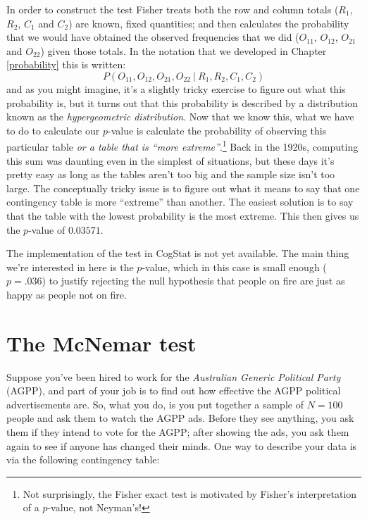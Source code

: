 \documentclass[
  11pt,
  a4paper,
  twoside,symmetric,openright]{book}
\theoremstyle{break}
\theoremstyle{break}
\begin{document}
In order to construct the test Fisher treats both the row and column totals (\(R_1\), \(R_2\), \(C_1\) and \(C_2\)) are known, fixed quantities; and then calculates the probability that we would have obtained the observed frequencies that we did (\(O_{11}\), \(O_{12}\), \(O_{21}\) and \(O_{22}\)) given those totals. In the notation that we developed in Chapter \ref{probability} this is written:
\[
P(O_{11}, O_{12}, O_{21}, O_{22} \ | \ R_1, R_2, C_1, C_2) 
\]
and as you might imagine, it's a slightly tricky exercise to figure out what this probability is, but it turns out that this probability is described by a distribution known as the \emph{hypergeometric distribution}. Now that we know this, what we have to do to calculate our \(p\)-value is calculate the probability of observing this particular table \emph{or a table that is ``more extreme''}.\footnote{Not surprisingly, the Fisher exact test is motivated by Fisher's interpretation of a \(p\)-value, not Neyman's!} Back in the 1920s, computing this sum was daunting even in the simplest of situations, but these days it's pretty easy as long as the tables aren't too big and the sample size isn't too large. The conceptually tricky issue is to figure out what it means to say that one contingency table is more ``extreme'' than another. The easiest solution is to say that the table with the lowest probability is the most extreme. This then gives us the \(p\)-value of \(0.03571\).

The implementation of the test in CogStat is not yet available. The main thing we're interested in here is the \(p\)-value, which in this case is small enough (\(p=.036\)) to justify rejecting the null hypothesis that people on fire are just as happy as people not on fire.

\section{The McNemar test}\label{mcnemar}

Suppose you've been hired to work for the \emph{Australian Generic Political Party} (AGPP), and part of your job is to find out how effective the AGPP political advertisements are. So, what you do, is you put together a sample of \(N=100\) people and ask them to watch the AGPP ads. Before they see anything, you ask them if they intend to vote for the AGPP; after showing the ads, you ask them again to see if anyone has changed their minds. One way to describe your data is via the following contingency table:
\end{document}
